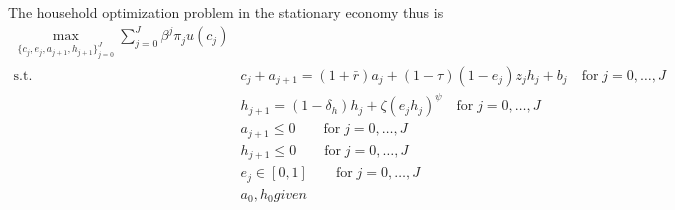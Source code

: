 The household optimization problem in the stationary economy thus is
\begin{align*}
    \max_{\{c_j, e_j, a_{j+1}, h_{j+1}\}_{j=0}^J} \sum_{j=0}^J \beta^j \pi_{j} u(c_j) \\
    \text{s.t.} \;  & c_j + a_{j+1} = (1+\bar{r}) a_j + (1-\tau) (1-e_j) z_j h_j + b_j \quad\text{for}\; j=0,\dots,J \\
                    & h_{j+1} = (1-\delta_h) h_j + \zeta (e_j h_j)^\psi \quad\text{for}\; j=0,\dots,J \\
                    & a_{j+1} \leq 0 \quad \quad\text{for}\; j=0,\dots,J \\
                    & h_{j+1} \leq 0 \quad \quad\text{for}\; j=0,\dots,J \\
                    & e_j \in [0, 1] \quad \quad\text{for}\; j=0,\dots,J \\
                    & a_0, h_0 given
\end{align*}


